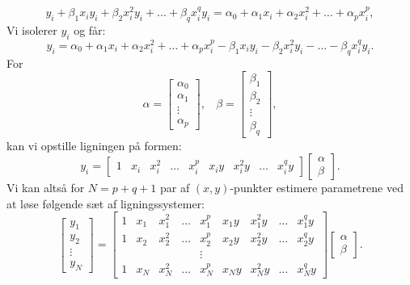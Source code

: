 \documentclass[12pt]{report}
\theoremstyle{break}
\theoremstyle{break}
\begin{document}
 \[y_i+\beta_1 x_iy_i+\beta_2 x_i^2y_i+\ldots+\beta_q x_i^qy_i = \alpha_0+\alpha_1 x_i+\alpha_2x_i^2 +\ldots+\alpha_p x_i^p,\]
 Vi isolerer $y_i$ og får:
 \[y_i = \alpha_0+\alpha_1 x_i+\alpha_2x_i^2 +\ldots+\alpha_p x_i^p-\beta_1 x_iy_i-\beta_2 x_i^2y_i-\ldots-\beta_q x_i^qy_i.\]
 For \[\alpha = \begin{bmatrix}\alpha_0\\\alpha_1\\\vdots\\\alpha_p\end{bmatrix},~~~~\beta = \begin{bmatrix}\beta_1\\\beta_2\\\vdots\\\beta_q\end{bmatrix},\]
 kan vi opstille ligningen på formen:
 \[y_i = \begin{bmatrix}1 & x_i & x_i^2 & \ldots & x_i^p & x_iy & x_i^2y & \ldots & x_i^qy \end{bmatrix}\begin{bmatrix}\alpha\\\beta\end{bmatrix}.\]
 Vi kan altså for $N=p+q+1$ par af $(x,y)$-punkter estimere parametrene ved at løse følgende sæt af ligningssystemer:
 \[\begin{bmatrix}y_1\\y_2\\\vdots\\y_{N}\end{bmatrix} = \begin{bmatrix}
 1 & x_1 & x_1^2 & \ldots & x_1^p & x_1y & x_1^2y & \ldots & x_1^qy \\
 1 & x_2 & x_2^2 & \ldots & x_2^p & x_2y & x_2^2y & \ldots & x_2^qy \\
  &  &  &  & \vdots & & & & \\
 1 & x_N & x_N^2 & \ldots & x_N^p & x_Ny & x_N^2y & \ldots & x_N^qy
 \end{bmatrix}\begin{bmatrix}\alpha\\\beta\end{bmatrix}.\]
\end{document}
